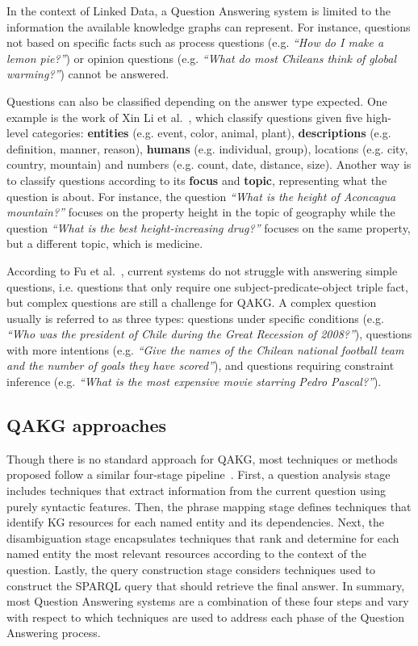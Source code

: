 In the context of Linked Data, a Question Answering system is limited to the information the 
available knowledge graphs can represent. For instance, questions not based on specific facts 
such as process questions (e.g. \textit{“How do I make a lemon pie?”}) or opinion questions 
(e.g. \textit{“What do most Chileans think of global warming?”}) cannot be answered.

Questions can also be classified depending on the answer type expected. One example is the work 
of Xin Li et al.~\cite{qa:LiR02}, which classify questions given five high-level categories: 
\textbf{entities} (e.g. event, color, animal, plant), \textbf{descriptions} (e.g. definition, 
manner, reason), \textbf{humans} (e.g. individual, group), locations (e.g. city, country, 
mountain) and numbers (e.g. count, date, distance, size). Another way is to classify questions 
according to its \textbf{focus} and \textbf{topic}, representing what the question is about. 
For instance, the question \textit{“What is the height of Aconcagua mountain?”} focuses on the 
property height in the topic of geography while the question \textit{“What is the best 
height-increasing drug?”} focuses on the same property, but a different topic, which is medicine.

According to Fu et al.~\cite{qa:FuQTLYS20abs-2007-13069}, current systems do not struggle with 
answering simple questions, i.e. questions that only require one subject-predicate-object 
triple fact, but complex questions are still a challenge for QAKG. A complex question usually 
is referred to as three types: questions under specific conditions (e.g. \textit{“Who was the 
president of Chile during the Great Recession of 2008?”}), questions with more intentions (e.g. 
\textit{“Give the names of the Chilean national football team and the number of goals they have 
scored”}), and questions requiring constraint inference (e.g. \textit{“What is the most 
expensive movie starring Pedro Pascal?”}).

\subsection{QAKG approaches}
\label{cap2:qakg/approaches}
Though there is no standard approach for QAKG, most techniques or methods proposed follow a 
similar four-stage pipeline~\cite{qa:core-techniques-DiefenbachLSM18}. First, a question 
analysis stage includes techniques that extract information from the current question using 
purely syntactic features. Then, the phrase mapping stage defines techniques that identify KG 
resources for each named entity and its dependencies. Next, the disambiguation stage 
encapsulates techniques that rank and determine for each named entity the most relevant 
resources according to the context of the question. Lastly, the query construction stage 
considers techniques used to construct the SPARQL query that should retrieve the final answer. 
In summary, most Question Answering systems are a combination of these four steps and vary with 
respect to which techniques are used to address each phase of the Question Answering process.

